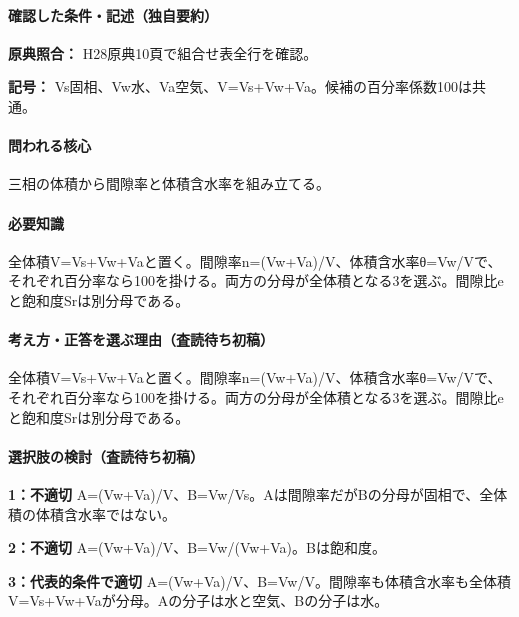 \paragraph{確認した条件・記述（独自要約）}\mbox{}\par

\noindent\textbf{原典照合：} H28原典10頁で組合せ表全行を確認。\par

\noindent\textbf{記号：} Vs固相、Vw水、Va空気、V=\allowbreak{}Vs+Vw+Va。候補の百分率係数100は共通。\par

\paragraph{問われる核心} 三相の体積から間隙率と体積含水率を組み立てる。

\paragraph{必要知識} 全体積V=\allowbreak{}Vs+Vw+Vaと置く。間隙率n=\allowbreak{}(Vw+Va)/V、体積含水率θ=Vw/Vで、それぞれ百分率なら100を掛ける。両方の分母が全体積となる3を選ぶ。間隙比eと飽和度Srは別分母である。

\paragraph{考え方・正答を選ぶ理由（査読待ち初稿）} 全体積V=\allowbreak{}Vs+Vw+Vaと置く。間隙率n=\allowbreak{}(Vw+Va)/V、体積含水率θ=Vw/Vで、それぞれ百分率なら100を掛ける。両方の分母が全体積となる3を選ぶ。間隙比eと飽和度Srは別分母である。

\paragraph{選択肢の検討（査読待ち初稿）}\mbox{}\par

\noindent\textbf{1：不適切} A=\allowbreak{}(Vw+Va)/V、B=\allowbreak{}Vw/Vs。Aは間隙率だがBの分母が固相で、全体積の体積含水率ではない。\par

\noindent\textbf{2：不適切} A=\allowbreak{}(Vw+Va)/V、B=\allowbreak{}Vw/(Vw+Va)。Bは飽和度。\par

\noindent\textbf{3：代表的条件で適切} A=\allowbreak{}(Vw+Va)/V、B=\allowbreak{}Vw/V。間隙率も体積含水率も全体積V=\allowbreak{}Vs+Vw+Vaが分母。Aの分子は水と空気、Bの分子は水。\par

